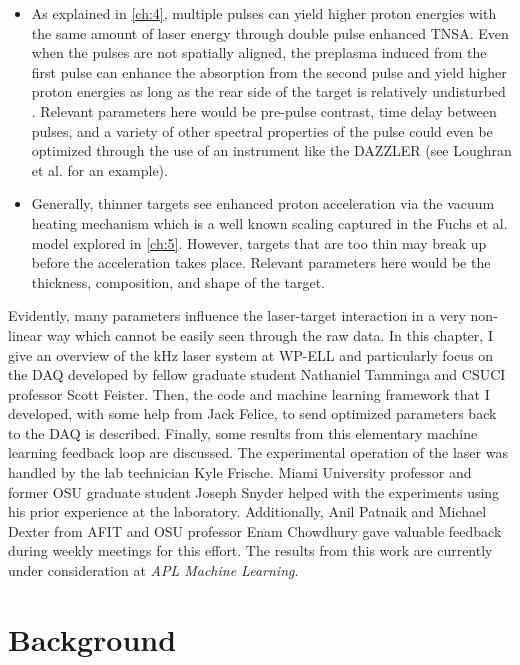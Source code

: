 \begin{itemize}
\item As explained in \autoref{ch:4}, multiple pulses can yield higher proton energies with the same amount of laser energy through double pulse enhanced \gls{TNSA}. Even when the pulses are not spatially aligned, the preplasma induced from the first pulse can enhance the absorption from the second pulse and yield higher proton energies as long as the rear side of the target is relatively undisturbed \cite{Macchi_2013_RevModPhys}. Relevant parameters here would be pre-pulse contrast, time delay between pulses, and a variety of other spectral properties of the pulse could even be optimized through the use of an instrument like the DAZZLER (see Loughran et al. \cite{Loughran_2023_HPLSE} for an example). 

\item Generally, thinner targets see enhanced proton acceleration via the vacuum heating mechanism which is a well known scaling captured in the Fuchs et al. \cite{Fuchs_2005_Nat} model explored in \autoref{ch:5}. However, targets that are too thin may break up before the acceleration takes place. Relevant parameters here would be the thickness, composition, and shape of the target. 
\end{itemize}
Evidently, many parameters influence the laser-target interaction in a very non-linear way which cannot be easily seen through the raw data. In this chapter, I give an overview of the kHz laser system at \gls{WP-ELL} and particularly focus on the \gls{DAQ} developed by fellow graduate student Nathaniel Tamminga and \gls{CSUCI} professor Scott Feister. Then, the code and machine learning framework that I developed, with some help from Jack Felice, to send optimized parameters back to the \gls{DAQ} is described. Finally, some results from this elementary machine learning feedback loop are discussed. The experimental operation of the laser was handled by the lab technician Kyle Frische. Miami University professor and former OSU graduate student Joseph Snyder helped with the experiments using his prior experience at the laboratory. Additionally, Anil Patnaik and Michael Dexter from AFIT and OSU professor Enam Chowdhury gave valuable feedback during weekly meetings for this effort. The results from this work are currently under consideration at \emph{APL Machine Learning}.

\section{Background} \label{sec:lab_background}

